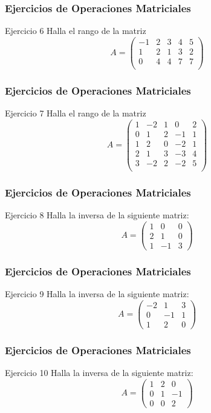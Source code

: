 \documentclass[aspectratio=169]{beamer}
\begin{document}
\begin{frame}
  \frametitle{Ejercicios de Operaciones Matriciales}
  \begin{block}{Ejercicio 6}
Halla el rango de la matriz
\[
A= \left(\begin{array}{rrrrr}
-1&2&3&4&5\\
1&2&1&3&2\\
0&4&4&7&7\\
\end{array}\right)
\]
  \end{block}
\end{frame}


\begin{frame}
  \frametitle{Ejercicios de Operaciones Matriciales}
  \begin{block}{Ejercicio 7}
Halla el rango de la matriz
\[
A= \left(\begin{array}{rrrrr}
1&-2&1&0&2\\
0&1&2&-1&1\\
1&2&0&-2&1\\
2&1&3&-3&4\\
3&-2&2&-2&5\\
\end{array}\right)
\]
  \end{block}
\end{frame}


\begin{frame}
  \frametitle{Ejercicios de Operaciones Matriciales}
  \begin{block}{Ejercicio 8}
Halla la inversa de la siguiente matriz:
\[
A= \left(\begin{array}{rrr}
1&0&0\\
2&1&0\\
1&-1&3
\end{array}\right)
\]
  \end{block}
\end{frame}

\begin{frame}
  \frametitle{Ejercicios de Operaciones Matriciales}
  \begin{block}{Ejercicio 9}
Halla la inversa de la siguiente matriz:
\[
A= \left(\begin{array}{rrr}
-2&1&3\\
0&-1&1\\
1&2&0
\end{array}\right)
\]
  \end{block}
\end{frame}

\begin{frame}
  \frametitle{Ejercicios de Operaciones Matriciales}
  \begin{block}{Ejercicio 10}
Halla la inversa de la siguiente matriz:
\[
A= \left(\begin{array}{rrr}
1&2&0\\
0&1&-1\\
0&0&2
\end{array}\right)
\]
  \end{block}
\end{frame}
\end{document}
